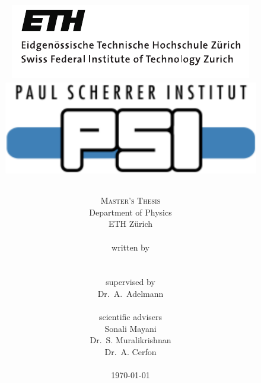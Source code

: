 \begin{titlepage}
\title{
    \begin{figure}
    \includegraphics[scale=0.65]{figures/logos/ethlogo_full}
    \hfill
    \includegraphics[scale=0.37]{figures/logos/psi_logo_blue}
    \end{figure}\vspace*{-5cm}
\FloatBarrier\parindent 0pt
\bfseries {\huge {}}
}
\author{
        \textsc{{{\LARGE Master's Thesis}}} \\[5pt]
        \small Department of Physics \\[5pt] \small ETH Z{\"u}rich \vspace{0.4cm} \\[0.2in]
        \\ \small written by \\[5pt]
         \\ 
        \vspace{1cm} \\
        \small supervised by \\[5pt]
        Dr.\ A.\ Adelmann \\
		\vspace{0.5cm} \\
        \small scientific advisers \\[5pt]
        Sonali Mayani \\
        Dr.\ S. Muralikrishnan \\
        Dr.\ A. Cerfon \\
        \vspace{1.5cm} \\
        \today
}
\date{}
\maketitle
\end{titlepage}
